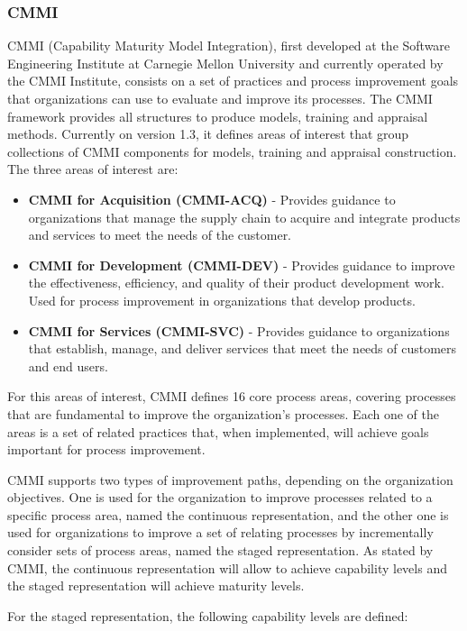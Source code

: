 \subsubsection{CMMI}


CMMI (Capability Maturity Model Integration), first developed at the Software Engineering Institute at Carnegie Mellon University and currently operated by the CMMI Institute, consists on a set of practices and process improvement goals that organizations can use to evaluate and improve its processes. The CMMI framework provides all structures to produce models, training and appraisal methods.
Currently on version 1.3, it defines areas of interest that group collections of CMMI components for models, training and appraisal construction. The three areas of interest are:

\begin{itemize}

\item \textbf{CMMI for Acquisition (CMMI-ACQ)\cite{cmmiAcquisition}} - Provides guidance to organizations that manage the supply chain to acquire and integrate products and services to meet the needs of the customer.

\item \textbf{CMMI for Development (CMMI-DEV)\cite{cmmi}} - Provides guidance to improve the effectiveness, efficiency, and quality of their product development work. Used for process improvement in organizations that develop products.

\item \textbf{CMMI for Services (CMMI-SVC)\cite{cmmiServices}} - Provides guidance to organizations that establish, manage, and deliver services that meet the needs of customers and end users.

\end{itemize}

For this areas of interest, CMMI defines 16 core process areas, covering processes that are fundamental to improve the organization's processes. Each one of the areas is a set of related practices that, when implemented, will achieve goals important for process improvement.\par
CMMI supports two types of improvement paths, depending on the organization objectives. One is used for the organization to improve processes related to a specific process area, named the continuous representation, and the other one is used for organizations to improve a set of relating processes by incrementally consider sets of process areas, named the staged representation. As stated by CMMI, the continuous representation will allow to achieve capability levels and the staged representation will achieve maturity levels.\par
For the staged representation, the following capability levels are defined:

